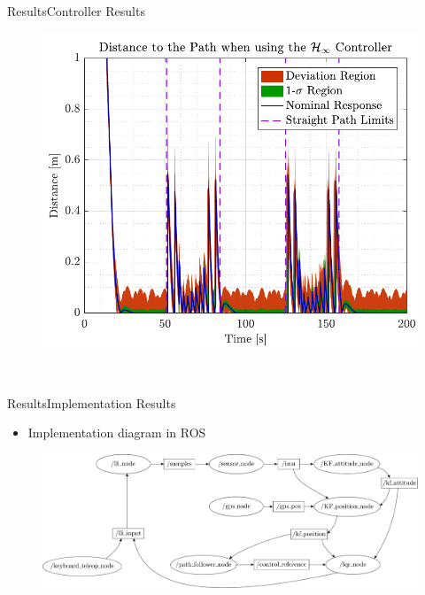 \begin{frame}{Results}{Controller Results}
\begin{minipage}{0.45\linewidth}
\begin{figure}[H]
                \includegraphics[width=1\linewidth]{figures/dist_rob}
            \end{figure}             
        \end{minipage}\hfill \\    
\end{frame}

\begin{frame}{Results}{Implementation Results}
    \begin{itemize}
        \item Implementation diagram in ROS
    \end{itemize}
    \begin{figure}[H]
        \centering
        \includegraphics[width=1\textwidth]{figures/diagramROS}
    \end{figure}  
\end{frame}


